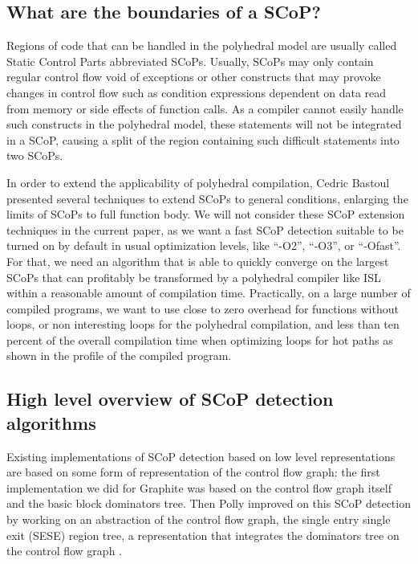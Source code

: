 \documentclass{sigplanconf}
\begin{document}
\subsection{What are the boundaries of a SCoP?}

Regions of code that can be handled in the polyhedral model are usually called
Static Control Parts abbreviated SCoPs.  Usually, SCoPs may only contain regular
control flow void of exceptions or other constructs that may provoke changes in
control flow such as condition expressions dependent on data read from memory or
side effects of function calls.  As a compiler cannot easily handle such
constructs in the polyhedral model, these statements will not be integrated in a
SCoP, causing a split of the region containing such difficult statements into
two SCoPs.

In order to extend the applicability of polyhedral compilation, Cedric Bastoul
presented several techniques \cite{bastoul} to extend SCoPs to general
conditions, enlarging the limits of SCoPs to full function body.  We will not
consider these SCoP extension techniques in the current paper, as we want a fast
SCoP detection suitable to be turned on by default in usual optimization levels,
like ``-O2'', ``-O3'', or ``-Ofast''.  For that, we need an algorithm that is
able to quickly converge on the largest SCoPs that can profitably be transformed
by a polyhedral compiler like ISL \cite{verdoolaege} within a reasonable amount
of compilation time.  Practically, on a large number of compiled programs, we
want to use close to zero overhead for functions without loops, or non
interesting loops for the polyhedral compilation, and less than ten percent of
the overall compilation time when optimizing loops for hot paths as shown in the
profile of the compiled program.

\subsection{High level overview of SCoP detection algorithms}

Existing implementations of SCoP detection based on low level representations
are based on some form of representation of the control flow graph: the first
implementation we did for Graphite \cite{spop-grosser} was based on the control
flow graph itself and the basic block dominators tree.  Then Polly improved on
this SCoP detection by working on an abstraction of the control flow graph, the
single entry single exit (SESE) region tree, a representation that integrates
the dominators tree on the control flow graph \cite{keshav-pingali}.
\end{document}
